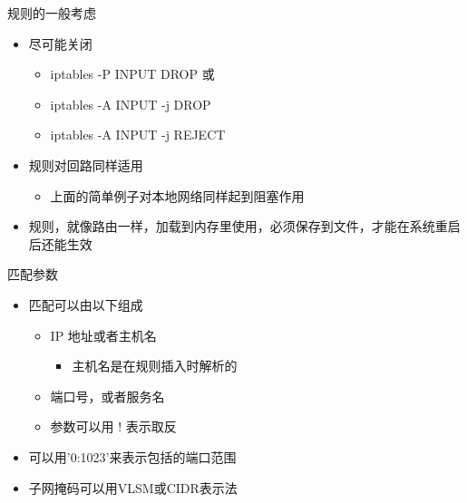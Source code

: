  \begin{frame}{规则的一般考虑}
\begin{itemize}
\item 尽可能关闭

\begin{itemize}
\item iptables -P INPUT DROP 或
\item iptables -A INPUT -j DROP
\item iptables -A INPUT -j REJECT
\end{itemize}
\item 规则对回路同样适用

\begin{itemize}
\item 上面的简单例子对本地网络同样起到阻塞作用
\end{itemize}
\item 规则，就像路由一样，加载到内存里使用，必须保存到文件，才能在系统重启后还能生效
\end{itemize}

\end{frame} 
 \begin{frame}{匹配参数}
\begin{itemize}
\item 匹配可以由以下组成

\begin{itemize}
\item IP 地址或者主机名

\begin{itemize}
\item \alert{主机名是在规则插入时解析的}
\end{itemize}
\item 端口号，或者服务名
\item 参数可以用 ! 表示取反
\end{itemize}
\item 可以用'0:1023'来表示包括的端口范围
\item 子网掩码可以用VLSM或CIDR表示法
\end{itemize}

\end{frame} 

